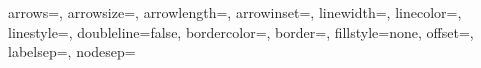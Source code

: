 \newlength{\EdgeLineWid}
\setlength{\EdgeLineWid}{\EdgeLineWidth}
\newcommand{\EdgeLineSty}{\EdgeLineStyle}
\newcommand{\EdgeLineCol}{\EdgeLineColor}
\newcommand{\EdgeLabelSca}{1}
\newcommand{\EdgeLabelCol}{\EdgeLabelColor}
\newlength{\EdgeArrowSZDim}
\setlength{\EdgeArrowSZDim}{\EdgeArrowWidth}
\newcommand{\EdgeArrowSZNum}{\EdgeArrowLengthCoef}
\newcommand{\EdgeArrowSty}{\EdgeArrowStyle}
\newcommand{\EdgeArrowIns}{\EdgeArrowInset}
\newlength{\EdgeLineBord}\setlength{\EdgeLineBord}{0pt}
\newlength{\ZZSiZ}
\setlength{\ZZSiZ}{\ZZSize}%
\newcommand{\ZZLineWid}{\ZZLineWidth}%
\newlength{\EdgeOff}
\setlength{\EdgeOff}{\EdgeOffset}
\newcommand{\VaucArcAng}{\VaucArcAngle}
\newcommand{\VaucLArcAng}{\VaucLArcAngle}
\newlength{\VaucArcOff}
\setlength{\VaucArcOff}{\VaucArcOffset}
\newcommand{\VaucArcCurv}{\VaucArcCurvature}
\newcommand{\VaucLArcCurv}{\VaucLArcCurvature}
\newcommand{\LoopAng}{\LoopAngle}
\newcommand{\CLoopAng}{\CLoopAngle}
\newcommand{\LoopVarAng}{\LoopVarAngle}
\newlength{\LoopOff}\setlength{\LoopOff}{\LoopOffset}
\newlength{\LoopVarOff}\setlength{\LoopVarOff}{\LoopVarOffset}
\newlength{\EdgeNodeSP}\setlength{\EdgeNodeSP}{\EdgeNodeSep}
\newlength{\TransLabelSP}\setlength{\TransLabelSP}{\TransLabelSep}
\newcommand{\EdgeLabelPos}{\EdgeLabelPosit}
\newcommand{\ArcLabelPos}{\ArcLabelPosit}
\newcommand{\LArcLabelPos}{\LArcLabelPosit}
\newcommand{\LoopLabelPos}{\LoopLabelPosit}
\newcommand{\CLoopLabelPos}{\CLoopLabelPosit}
\newcommand{\InitStateLabelPos}{\InitStateLabelPosit}
\newcommand{\FinalStateLabelPos}{\FinalStateLabelPosit}
%
           {arrows=\EdgeArrowSty,%
            arrowsize=\EdgeArrowSZDim,%
            arrowlength=\EdgeArrowSZNum,%
            arrowinset=\EdgeArrowIns,%
            linewidth=\EdgeLineWid,%
            linecolor=\EdgeLineCol,%
            linestyle=\EdgeLineSty,%
            doubleline=false,%
            bordercolor=\EdgeLineBorderColor,%
            border=\EdgeLineBord,%
            fillstyle=none,%
            offset=\EdgeOff,%
            labelsep=\TransLabelSP,%
            nodesep=\EdgeNodeSP}
